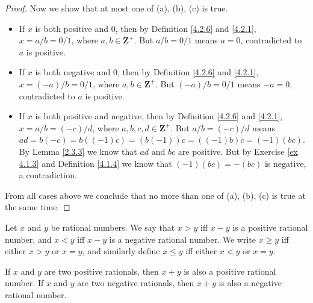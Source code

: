 \begin{proof}
    Now we show that at most one of (a), (b), (c) is true.
    \begin{itemize}
        \item If \(x\) is both positive and \(0\), then by Definition \ref{4.2.6} and \ref{4.2.1}, \(x = a / b = 0 / 1\), where \(a, b \in \mathbf{Z}^+\).
              But \(a / b = 0 / 1\) means \(a = 0\), contradicted to \(a\) is positive.
        \item If \(x\) is both negative and \(0\), then by Definition \ref{4.2.6} and \ref{4.2.1}, \(x = (-a) / b = 0 / 1\), where \(a, b \in \mathbf{Z}^+\).
              But \((-a) / b = 0 / 1\) means \(-a = 0\), contradicted to \(a\) is positive.
        \item If \(x\) is both positive and negative, then by Definition \ref{4.2.6} and \ref{4.2.1}, \(x = a / b = (-c) / d\), where \(a, b, c, d \in \mathbf{Z}^+\).
              But \(a / b = (-c) / d\) means \(ad = b(-c) = b((-1)c) = (b(-1))c = ((-1)b)c = (-1)(bc)\).
              By Lemma \ref{2.3.3} we know that \(ad\) and \(bc\) are positive.
              But by Exercise \ref{ex 4.1.3} and Definition \ref{4.1.4} we know that \((-1)(bc) = -(bc)\) is negative, a contradiction.
    \end{itemize}
    From all cases above we conclude that no more than one of (a), (b), (c) is true at the same time.
\end{proof}

\begin{definition}\label{4.2.8}
    Let \(x\) and \(y\) be rational numbers.
    We say that \(x > y\) iff \(x - y\) is a positive rational number, and \(x < y\) iff \(x - y\) is a negative rational number.
    We write \(x \geq y\) iff either \(x > y\) or \(x = y\), and similarly define \(x \leq y\) iff either \(x < y\) or \(x = y\).
\end{definition}

\begin{additional corollary}\label{ac 4.2.4}
If \(x\) and \(y\) are two positive rationals, then \(x + y\) is also a positive rational number.
If \(x\) and \(y\) are two negative rationals, then \(x + y\) is also a negative rational number.
\end{additional corollary}

